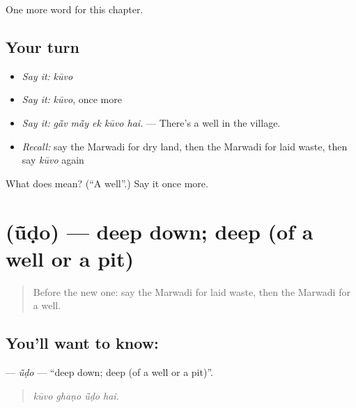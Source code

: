 \begin{grammarlens}[title={What you've built}]
One more word for this chapter.
\end{grammarlens}

\subsection*{Your turn}
\begin{itemize}
\raggedright
  \item \emph{Say it:} \emph{kūvo}
  \item \emph{Say it:} \emph{kūvo}, once more
  \item \emph{Say it:} \emph{gā̃v mā̃y ek kūvo hai.} — There's a well in the village.
  \item \emph{Recall:} say the Marwadi for dry land, then the Marwadi for laid waste, then say \emph{kūvo} again
\end{itemize}

\begin{tcolorbox}[breakable,colback=teal!4,colframe=teal!35!black,title={Before you move on}]
What does  mean? (\textquotedblleft{}A well\textquotedblright{}.) Say it once more.
\end{tcolorbox}
\section[\texorpdfstring{\mw{ऊंडो} (ū̃ḍo)}{ऊंडो (ū̃ḍo)}]{ (ū̃ḍo) — deep down; deep (of a well or a pit)}

\label{lesson:MW-C227-udo}



\begin{quote}
Before the new one: say the Marwadi for laid waste, then the Marwadi for a well.
\end{quote}

\subsection*{You'll want to know: }
\textbf{} — \emph{ū̃ḍo} — \textquotedblleft{}deep down; deep (of a well or a pit)\textquotedblright{}.

\begin{quote}
   
\end{quote}

\begin{quote}
\emph{kūvo ghaṇo ū̃ḍo hai.}
\end{quote}

